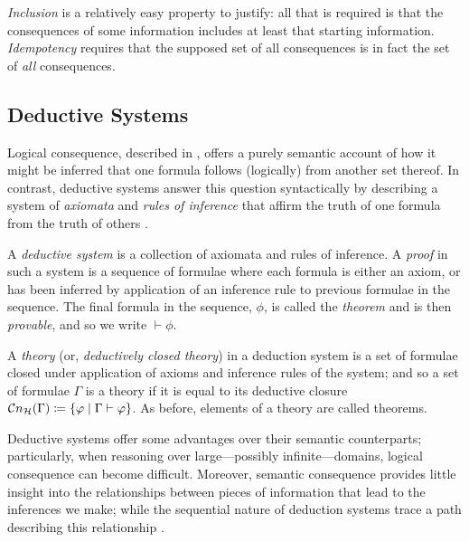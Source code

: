 \textit{Inclusion} is a relatively easy property to justify: all that is required is that the consequences of some
information includes at least that starting information. \textit{Idempotency} requires that the supposed set of all
consequences is in fact the set of \textit{all} consequences.

\subsection{Deductive Systems}
\label{subsection:deduction-systems}    Logical consequence,
described in , offers a purely semantic account of how it might be inferred that one
formula follows (logically) from another set thereof. In contrast, deductive systems answer this question syntactically by
describing a system of \textit{axiomata} and \textit{rules of inference} that affirm the truth of one formula from the truth
of others \cite[p. 49]{Ben1993Mathematical}.

\begin{definition}
	\label{definition:deductive-system} A \textit{deductive system} is a collection of axiomata and rules of inference. A \textit{proof}
	in such a system is a sequence of formulae where each formula is either an axiom, or has been inferred by application of
	an inference rule to previous formulae in the sequence. The final formula in the sequence, $\phi$, is called the
	\textit{theorem} and is then \textit{provable}, and so we write $\vdash \phi$.

	A \textit{theory} (or, \textit{deductively closed theory}) in a deduction system is a set of formulae closed under
	application of axioms and inference rules of the system; and so a set of formulae $\Gamma$ is a theory if it is equal to
	its deductive closure $\mathcal{C}n_{\mathcal{H}}(\Gamma) \coloneqq \{\varphi \mid \Gamma \vdash \varphi \}$. As before, elements
	of a theory are called theorems.
\end{definition}

Deductive systems offer some advantages over their semantic counterparts; particularly, when reasoning over large---possibly
infinite---domains, logical consequence can become difficult. Moreover, semantic consequence provides little insight into
the relationships between pieces of information that lead to the inferences we make; while the sequential nature of
deduction systems trace a path describing this relationship \cite{Ben1993Mathematical}.

